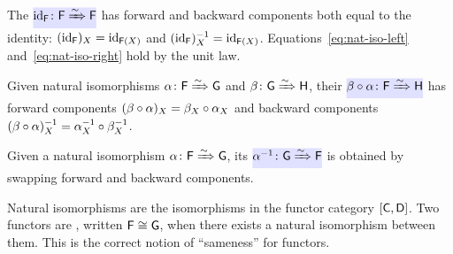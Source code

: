 \documentclass[../preamble]{subfiles}
\begin{document}
\begin{definition}
  \label{def:id-nat-iso}
  The 
  $\newmath{\id_{\Functor{F}} \colon \Functor{F} \xRightarrow{\sim} \Functor{F}}$
  has forward and backward components both equal to the identity:
  $(\operatorname{id}_{\mathsf{F}})_X = \operatorname{id}_{\mathsf{F}(X)}$
  and $(\operatorname{id}_{\mathsf{F}})^{-1}_X = \operatorname{id}_{\mathsf{F}(X)}$.
  Equations~\eqref{eq:nat-iso-left} and~\eqref{eq:nat-iso-right}
  hold by the unit law.
\end{definition}

\begin{definition}
  \label{def:compose-nat-iso}
  Given natural isomorphisms
  $\mathsf{\alpha} \colon \mathsf{F} \xRightarrow{\sim} \mathsf{G}$
  and
  $\mathsf{\beta} \colon \mathsf{G} \xRightarrow{\sim} \mathsf{H}$,
  their 
  $\newmath{\NatTrans{\beta} \circ \NatTrans{\alpha}
    \colon \Functor{F} \xRightarrow{\sim} \Functor{H}}$
  has forward components
  $(\mathsf{\beta} \circ \mathsf{\alpha})_X
    = \mathsf{\beta}_X \circ \mathsf{\alpha}_X$
  and backward components
  $(\mathsf{\beta} \circ \mathsf{\alpha})^{-1}_X
    = \mathsf{\alpha}^{-1}_X \circ \mathsf{\beta}^{-1}_X$.
\end{definition}

\begin{definition}
  \label{def:invert-nat-iso}
  Given a natural isomorphism
  $\mathsf{\alpha} \colon \mathsf{F} \xRightarrow{\sim} \mathsf{G}$,
  its 
  $\newmath{\NatTrans{\alpha}^{-1}
    \colon \Functor{G} \xRightarrow{\sim} \Functor{F}}$
  is obtained by swapping forward and backward components.
\end{definition}

\begin{remark}
  Natural isomorphisms are the isomorphisms in the functor category
  $[\mathsf{C}, \mathsf{D}]$.
  Two functors are ,
  written $\mathsf{F} \cong \mathsf{G}$,
  when there exists a natural isomorphism between them.
  This is the correct notion of ``sameness'' for functors.
\end{remark}
\end{document}
